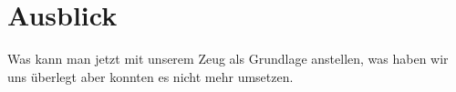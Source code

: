 \chapter{Ausblick}
\label{sec:outlook}

Was kann man jetzt mit unserem Zeug als Grundlage anstellen, was haben wir uns überlegt aber konnten es nicht mehr umsetzen.

  

 
 
 
 
 
 
 
 